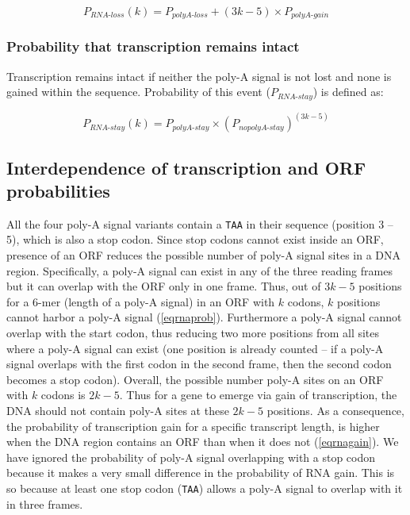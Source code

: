 \documentclass[12pt,a4paper]{article}
\begin{document}
{\begin{equation}
P_\textit{RNA-loss}(k) = P_\textit{polyA-loss} + (3k-5)\times P_\textit{polyA-gain}
\label{eqrnaloss}
\end{equation}

\subsubsection{Probability that transcription remains intact}

Transcription remains intact if neither the poly-A signal is not lost and none is gained within the sequence. Probability of this event ($P_\textit{RNA-stay}$) is defined as:

\begin{equation}
P_\textit{RNA-stay}(k) = P_\textit{polyA-stay} \times (P_\textit{nopolyA-stay})^{(3k-5)}
\label{eqrnastay}
\end{equation}
}
\subsection{Interdependence of transcription and ORF probabilities}

\label{rnaorfindependence}

All the four poly-A signal variants contain a \texttt{TAA} in their sequence (position 3 -- 5), which is also a stop codon. Since stop codons cannot exist inside an ORF, presence of an ORF reduces the possible number of poly-A signal sites in a DNA region. Specifically, a poly-A signal can exist in any of the three reading frames but it can overlap with the ORF only in one frame. Thus, out of $3k-5$ positions for a 6-mer (length of a poly-A signal) in an ORF with $k$ codons, $k$ positions cannot harbor a poly-A signal (\autoref{eqrnaprob}). Furthermore a poly-A signal cannot overlap with the start codon, thus reducing two more positions from all sites where a poly-A signal can exist (one position is already counted -- if a poly-A signal overlaps with the first codon in the second frame, then the second codon becomes a stop codon). Overall, the possible number poly-A sites on an ORF with $k$ codons is $2k-5$. Thus for a gene to emerge via gain of transcription, the DNA should not contain poly-A sites at these $2k-5$ positions. As a consequence, the probability of transcription gain for a specific transcript length, is higher when the DNA region contains an ORF than when it does not (\autoref{eqrnagain}). We have ignored the probability of poly-A signal overlapping with a stop codon because it makes a very small difference in the probability of RNA gain. This is so because at least one stop codon (\texttt{TAA}) allows a poly-A signal to overlap with it in three frames. 
\end{document}
